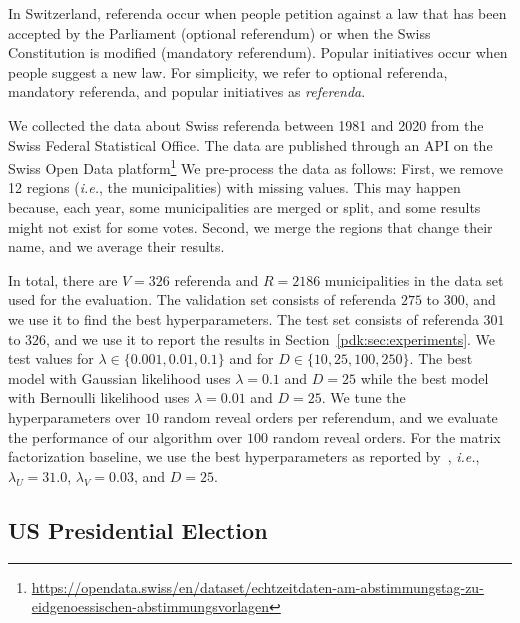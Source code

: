 In Switzerland, referenda occur when  people petition against a law that has been accepted by the Parliament (optional referendum) or when the Swiss Constitution is modified (mandatory referendum).
Popular initiatives occur when  people suggest a new law.
For simplicity, we refer to optional referenda, mandatory referenda, and popular initiatives as \textit{referenda}.

We collected the data about Swiss referenda between 1981 and 2020 from the Swiss Federal Statistical Office.
The data are published through an API on the Swiss Open Data platform\footnote{\url{https://opendata.swiss/en/dataset/echtzeitdaten-am-abstimmungstag-zu-eidgenoessischen-abstimmungsvorlagen}}
We pre-process the data as follows:
First, we remove 12 regions (\textit{i.e.}, the municipalities) with missing values.
This may happen because, each year, some municipalities are merged or split, and some results might not exist for some votes.
Second, we merge the regions that change their name, and we average their results.

In total, there are $V=326$ referenda and $R=2186$ municipalities in the data set used for the evaluation.
The validation set consists of referenda $275$ to $300$, and we use it to find the best hyperparameters.
The test set consists of referenda $301$ to $326$, and we use it to report the results in Section~\ref{pdk:sec:experiments}.
We test values for $\lambda \in \{0.001, 0.01, 0.1\}$ and for $D \in \{10, 25, 100, 250\}$.
The best model with Gaussian likelihood uses $\lambda=0.1$ and $D=25$ while the best model with Bernoulli likelihood uses $\lambda=0.01$ and $D=25$.
We tune the hyperparameters over $10$ random reveal orders per referendum, and we evaluate the performance of our algorithm over $100$ random reveal orders.
For the matrix factorization baseline, we use the best hyperparameters as reported by~\citet{etter2016online}, \textit{i.e.}, $\lambda_U = 31.0$, $\lambda_V = 0.03$, and $D = 25$.

\subsection{US Presidential Election}%
\label{app:us}

